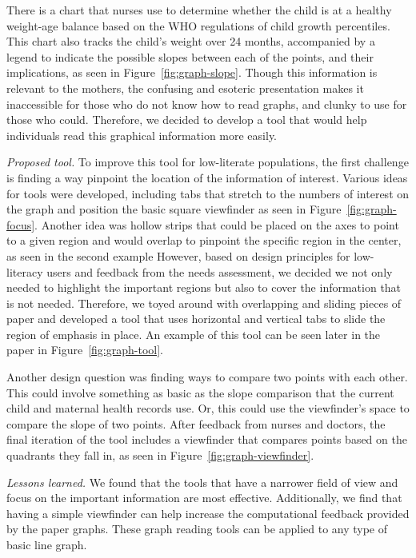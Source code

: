 \documentclass{sig-alternate}
\begin{document}
There is a chart that nurses use to determine whether the child is at a healthy weight-age balance based on the WHO regulations of child growth percentiles. This chart also tracks the child's weight over 24 months, accompanied by a legend to indicate the possible slopes between each of the points, and their implications, as seen in Figure~\ref{fig:graph-slope}. Though this information is relevant to the mothers, the confusing and esoteric presentation makes it inaccessible for those who do not know how to read graphs, and clunky to use for those who could. Therefore, we decided to develop a tool that would help individuals read this graphical information more easily.

\emph{Proposed tool.}
To improve this tool for low-literate populations, the first challenge is finding a way pinpoint the location of the information of interest. Various ideas for tools were developed, including tabs that stretch to the numbers of interest on the graph and position the basic square viewfinder as seen in Figure~\ref{fig:graph-focus}. Another idea was hollow strips that could be placed on the axes to point to a given region and would overlap to pinpoint the specific region in the center, as seen in the second example However, based on design principles for low-literacy users and feedback from the needs assessment, we decided we not only needed to highlight the important regions but also to cover the information that is not needed. Therefore, we toyed around with overlapping and sliding pieces of paper and developed a tool that uses horizontal and vertical tabs to slide the region of emphasis in place. An example of this tool can be seen later in the paper in Figure~\ref{fig:graph-tool}.

Another design question was finding ways to compare two points with each other. This could involve something as basic as the slope comparison that the current child and maternal health records use. Or, this could use the viewfinder's space to compare the slope of two points. After feedback from nurses and doctors, the final iteration of the tool includes a viewfinder that compares points based on the quadrants they fall in, as seen in Figure~\ref{fig:graph-viewfinder}.

\emph{Lessons learned.}
We found that the tools that have a narrower field of view and focus on the important information are most effective. Additionally, we find that having a simple viewfinder can help increase the computational feedback provided by the paper graphs. 
These graph reading tools can be applied to any type of basic line graph. 
\end{document}
